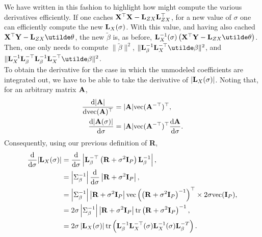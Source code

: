 \documentclass[10pt]{article}
\begin{document}
We have written in this fashion to highlight how might compute the
various derivatives efficiently. If one caches ${\bf X}^\top{\bf X} -
{\bf L}_{ZX}{\bf L}_{ZX}^\top$, for a new value of $\sigma$ one can
efficiently compute the new ${\bf L}_X(\sigma)$. With this value, and
having also cached ${\bf X}^\top{\bf Y} -
{\bf L}_{ZX}\utilde\theta$, the new $\utilde\beta$ is, as before, ${\bf L}_X^{-1}(\sigma)\left({\bf X}^\top{\bf Y} -
{\bf L}_{ZX}\utilde\theta\right)$. \\

Then, one only needs to compute $\|\utilde\beta\|^2$, $\|{\bf
  L}_\beta^{-1}{\bf L}_X^{-\top}\utilde\beta\|^2$, and $\|{\bf
  L}_X^{-1}{\bf L}_\beta^{-\top}{\bf
  L}_\beta^{-1}{\bf L}_X^{-\top}\utilde\beta\|^2$. \\

To obtain the derivative for the case in which the unmodeled
coefficients are integrated out, we have to be able to take the
derivative of $|{\bf L}_X(\sigma)|$. Noting that, for an arbitrary
matrix ${\bf A}$,
\begin{align*}
\frac{\mathrm{d}|{\bf A}|}{\mathrm{d}\mathrm{vec}({\bf A})^\top} & =
|{\bf A}|\mathrm{vec}({\bf A}^{-\top})^\top, \\
\frac{\mathrm{d}|{\bf A}(\sigma)|}{\mathrm{d}\sigma} & = |{\bf A}|\mathrm{vec}({\bf
  A}^{-\top})^\top \frac{\mathrm{d}{\bf A}}{\mathrm{d}\sigma}.
\end{align*}
Consequently, using our previous definition of {\bf R},
\begin{align*}
\frac{\mathrm{d}}{\mathrm{d}\sigma}|{\bf L}_X(\sigma)| & = 
\frac{\mathrm{d}}{\mathrm{d}\sigma}\left|{\bf
    L}_\beta^{-\top}\left({\bf R}+\sigma^2{\bf I}_P\right){\bf
    L}_\beta^{-1}\right|, \\
& = \left|\Sigma_\beta^{-1}\right|\frac{\mathrm{d}}{\mathrm{d}\sigma} 
\left|{\bf R}+\sigma^2{\bf I}_P\right|, \\
& = \left|\Sigma_\beta^{-1}\right|\left|{\bf R}+\sigma^2{\bf
    I}_P\right| \mathrm{vec}\left(\left({\bf R}+\sigma^2{\bf
    I}_P\right)^{-1}\right)^{\top} \times 2\sigma\mathrm{vec}({\bf
I}_P), \\
& = 2\sigma \left|\Sigma_\beta^{-1}\right|\left|{\bf R}+\sigma^2{\bf
    I}_P\right| \mathrm{tr}\left({\bf R}+\sigma^2{\bf
    I}_P\right)^{-1}, \\
& = 2\sigma\left|{\bf L}_X(\sigma)\right|\mathrm{tr}\left({\bf
    L}_\beta^{-1}{\bf L}_X^{-\top}(\sigma){\bf L}_X^{-1}(\sigma){\bf L}_\beta^{-T}\right).
\end{align*}
\end{document}
